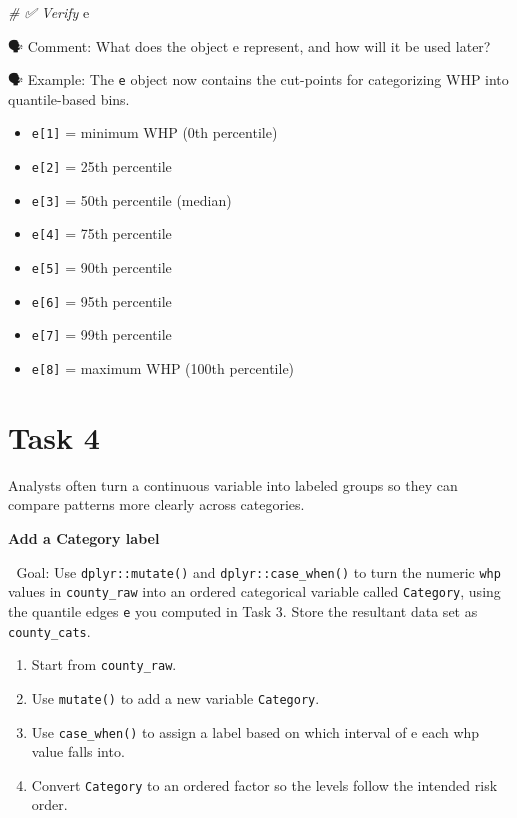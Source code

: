 \documentclass[
  12pt,
]{scrreprt}
\newenvironment{Shaded}{\begin{snugshade}}{\end{snugshade}}
\newcommand{\CommentTok}[1]{\textcolor[rgb]{0.56,0.35,0.01}{\textit{#1}}}
\newcommand{\NormalTok}[1]{#1}
\begin{document}
\begin{Shaded}
\begin{Highlighting}[]
\CommentTok{\# ✅  Verify}
\NormalTok{e}
\end{Highlighting}
\end{Shaded}

🗣 Comment: What does the object e represent, and how will it be used later?

🗣 Example: The \texttt{e} object now contains the cut-points for categorizing WHP into quantile-based bins.

\begin{itemize}
\item
  \texttt{e{[}1{]}} = minimum WHP (0th percentile)
\item
  \texttt{e{[}2{]}} = 25th percentile
\item
  \texttt{e{[}3{]}} = 50th percentile (median)
\item
  \texttt{e{[}4{]}} = 75th percentile
\item
  \texttt{e{[}5{]}} = 90th percentile
\item
  \texttt{e{[}6{]}} = 95th percentile
\item
  \texttt{e{[}7{]}} = 99th percentile
\item
  \texttt{e{[}8{]}} = maximum WHP (100th percentile)
\end{itemize}

\section{Task 4}\label{task-4}

Analysts often turn a continuous variable into labeled groups so they can compare patterns more clearly across categories.

\textbf{Add a Category label}

🎯 Goal: Use \texttt{dplyr::mutate()} and \texttt{dplyr::case\_when()} to turn the numeric \texttt{whp} values in \texttt{county\_raw} into an ordered categorical variable called \texttt{Category}, using the quantile edges \texttt{e} you computed in Task 3. Store the resultant data set as \texttt{county\_cats}.

\begin{enumerate}
\def\labelenumi{\arabic{enumi}.}
\item
  Start from \texttt{county\_raw}.
\item
  Use \texttt{mutate()} to add a new variable \texttt{Category}.
\item
  Use \texttt{case\_when()} to assign a label based on which interval of e each whp value falls into.
\item
  Convert \texttt{Category} to an ordered factor so the levels follow the intended risk order.
\end{enumerate}
\end{document}
